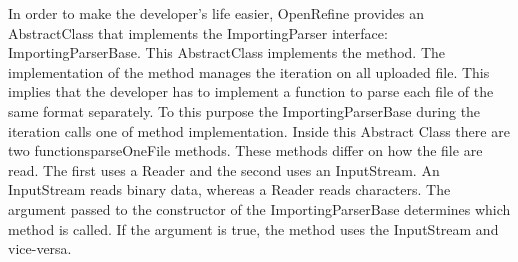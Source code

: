 In order to make the developer's life easier, OpenRefine provides an AbstractClass that implements the ImportingParser interface: ImportingParserBase. This AbstractClass implements the  method. The implementation of the  method manages the iteration on all uploaded file. This implies that the developer has to implement a function to parse each file of the same format separately. To this purpose the ImportingParserBase during the iteration calls one of  method implementation. Inside this Abstract Class there are two functions{parseOneFile} methods. These methods differ on how the file are read. The first uses a Reader and the second uses an InputStream. An InputStream reads binary data, whereas a Reader reads characters. The argument passed to the constructor of the ImportingParserBase determines which method is called. If the argument is true, the  method uses the InputStream and vice-versa.

